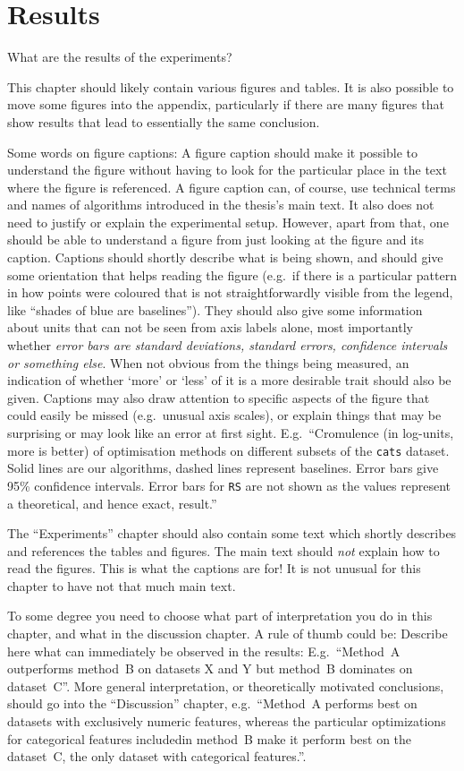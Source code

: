 \chapter{Results}\label{chap:results}

What are the results of the experiments?

This chapter should likely contain various figures and tables.
It is also possible to move some figures into the appendix, particularly if there are many figures that show results that lead to essentially the same conclusion.

Some words on figure captions:
A figure caption should make it possible to understand the figure without having to look for the particular place in the text where the figure is referenced.
A figure caption can, of course, use technical terms and names of algorithms introduced in the thesis's main text.
It also does not need to justify or explain the experimental setup.
However, apart from that, one should be able to understand a figure from just looking at the figure and its caption.
Captions should shortly describe what is being shown, and should give some orientation that helps reading the figure (e.g.\ if there is a particular pattern in how points were coloured that is not straightforwardly visible from the legend, like ``shades of blue are baselines'').
They should also give some information about units that can not be seen from axis labels alone, most importantly whether \emph{error bars are standard deviations, standard errors, confidence intervals or something else}.
When not obvious from the things being measured, an indication of whether `more' or `less' of it is a more desirable trait should also be given. 
Captions may also draw attention to specific aspects of the figure that could easily be missed (e.g.\ unusual axis scales), or explain things that may be surprising or may look like an error at first sight.
E.g.\ ``Cromulence (in log-units, more is better) of optimisation methods on different subsets of the \texttt{cats} dataset. Solid lines are our algorithms, dashed lines represent baselines. Error bars give 95\% confidence intervals. Error bars for \texttt{RS} are not shown as the values represent a theoretical, and hence exact, result.''

The ``Experiments'' chapter should also contain some text which shortly describes and references the tables and figures.
The main text should \emph{not} explain how to read the figures.
This is what the captions are for!
It is not unusual for this chapter to have not that much main text.

To some degree you need to choose what part of interpretation you do in this chapter, and what in the discussion chapter.
A rule of thumb could be:
Describe here what can immediately be observed in the results:
E.g.\ ``Method~A outperforms method~B on datasets X and Y but method~B dominates on dataset~C''.
More general interpretation, or theoretically motivated conclusions, should go into the ``Discussion'' chapter, e.g.\ ``Method~A performs best on datasets with exclusively numeric features, whereas the particular optimizations for categorical features includedin method~B make it perform best on the dataset~C, the only dataset with categorical features.''.

